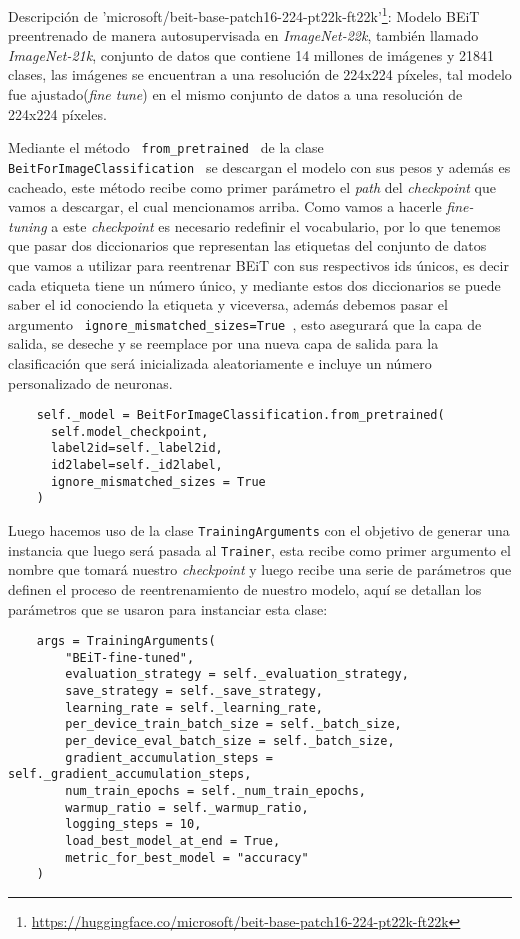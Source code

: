 Descripción de 'microsoft/beit-base-patch16-224-pt22k-ft22k'\footnote[1]{\url{https://huggingface.co/microsoft/beit-base-patch16-224-pt22k-ft22k}}: Modelo BEiT preentrenado de manera autosupervisada en \textit{ImageNet-22k}, también llamado \textit{ImageNet-21k}, conjunto de datos que contiene 14 millones de imágenes y 21841 clases, las imágenes se encuentran a una resolución de 224x224 píxeles, tal modelo fue ajustado(\textit{fine tune}) en el mismo conjunto de datos a una resolución de 224x224 píxeles.

Mediante el método \texttt{ from\_pretrained } de  la clase \texttt{ BeitForImageClassification } se descargan el modelo con sus pesos y además es cacheado, este método recibe como primer parámetro el \textit{path} del \textit{checkpoint} que vamos a descargar, el cual mencionamos arriba. Como vamos a hacerle \textit{fine-tuning} a este \textit{checkpoint} es necesario redefinir el vocabulario, por lo que tenemos que pasar dos diccionarios que representan las etiquetas del conjunto de datos que vamos a utilizar para reentrenar BEiT con sus respectivos ids únicos, es decir cada etiqueta tiene un número único, y mediante estos dos diccionarios se puede saber el id conociendo la etiqueta y viceversa, además debemos pasar el argumento \texttt{ ignore\_mismatched\_sizes=True }, esto asegurará que la capa de salida, se deseche y se reemplace por una nueva capa de salida para la clasificación que será inicializada aleatoriamente e incluye un número personalizado de neuronas.

\begin{verbatim}
    self._model = BeitForImageClassification.from_pretrained(
      self.model_checkpoint,
      label2id=self._label2id,
      id2label=self._id2label,
      ignore_mismatched_sizes = True
    )
\end{verbatim}

Luego hacemos uso de la clase \texttt{TrainingArguments} con el objetivo de generar una instancia que luego será pasada al \texttt{Trainer}, esta recibe como primer argumento el nombre que tomará nuestro \textit{checkpoint} y luego recibe una serie de parámetros que definen el proceso de reentrenamiento de nuestro modelo, aquí se detallan los parámetros que se usaron para instanciar esta clase:

\begin{verbatim}
    args = TrainingArguments(
        "BEiT-fine-tuned",
        evaluation_strategy = self._evaluation_strategy,
        save_strategy = self._save_strategy,
        learning_rate = self._learning_rate,
        per_device_train_batch_size = self._batch_size,
        per_device_eval_batch_size = self._batch_size,
        gradient_accumulation_steps = self._gradient_accumulation_steps,
        num_train_epochs = self._num_train_epochs,
        warmup_ratio = self._warmup_ratio,
        logging_steps = 10,
        load_best_model_at_end = True,
        metric_for_best_model = "accuracy"
    )
\end{verbatim}

